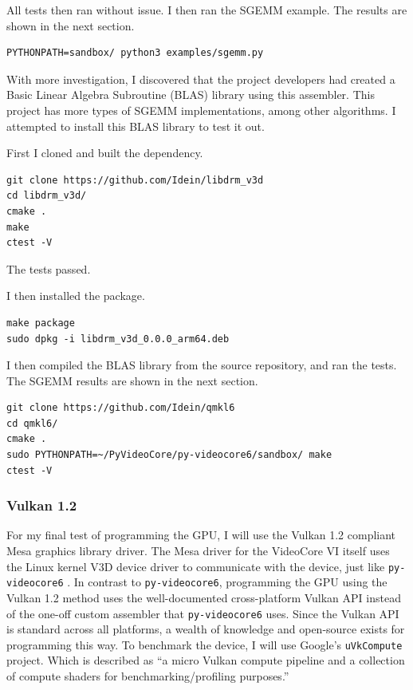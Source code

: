 \documentclass[12pt]{article}
\begin{document}
All tests then ran without issue. I then ran the SGEMM example. The results are shown in the next section.

\begin{lstlisting}
PYTHONPATH=sandbox/ python3 examples/sgemm.py
\end{lstlisting}

With more investigation, I discovered that the project developers had created a Basic Linear Algebra Subroutine (BLAS) library using this assembler. This project has more types of SGEMM implementations, among other algorithms. I attempted to install this BLAS library to test it out.

First I cloned and built the dependency.
\begin{lstlisting}
git clone https://github.com/Idein/libdrm_v3d
cd libdrm_v3d/
cmake .
make
ctest -V
\end{lstlisting}

The tests passed.

I then installed the package.

\begin{lstlisting}
make package
sudo dpkg -i libdrm_v3d_0.0.0_arm64.deb
\end{lstlisting}

I then compiled the BLAS library from the source repository, and ran the tests. The SGEMM results are shown in the next section.

\begin{lstlisting}
git clone https://github.com/Idein/qmkl6
cd qmkl6/
cmake .
sudo PYTHONPATH=~/PyVideoCore/py-videocore6/sandbox/ make
ctest -V
\end{lstlisting}

\subsubsection{Vulkan 1.2}

For my final test of programming the GPU, I will use the Vulkan 1.2 compliant Mesa graphics library driver. The Mesa driver for the VideoCore VI itself uses the Linux kernel V3D device driver to communicate with the device, just like \verb|py-videocore6| \cite{mesa3d}. In contrast to \verb|py-videocore6|, programming the GPU using the Vulkan 1.2 method uses the well-documented cross-platform Vulkan API instead of the one-off custom assembler that \verb|py-videocore6| uses. Since the Vulkan API is standard across all platforms, a wealth of knowledge and open-source exists for programming this way. To benchmark the device, I will use Google's \verb|uVkCompute| project. Which is described as ``a micro Vulkan compute pipeline and a collection of compute shaders for benchmarking/profiling purposes\cite{uVkCompute}.''
\end{document}
